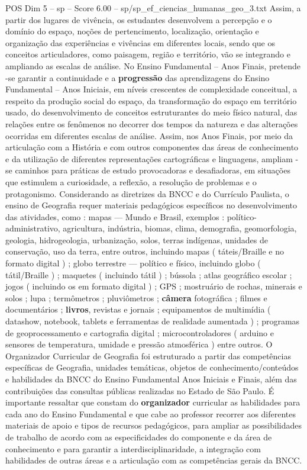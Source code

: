 \begin{textsample}{POS Dim 5 – sp – Score 6.00 – sp/sp\_ef\_ciencias\_humanas\_geo\_3.txt}
Assim, a partir dos lugares de vivência, os estudantes desenvolvem a percepção e o domínio do espaço, noções de pertencimento, localização, orientação e organização das experiências e vivências em diferentes locais, sendo que os conceitos articuladores, como paisagem, região e território, vão se integrando e ampliando as escalas de análise.
No Ensino Fundamental – Anos Finais, pretende -se garantir a continuidade e a \textbf{progressão} das aprendizagens do Ensino Fundamental – Anos Iniciais, em níveis crescentes de complexidade conceitual, a respeito da produção social do espaço, da transformação do espaço em território usado, do desenvolvimento de conceitos estruturantes do meio físico natural, das relações entre os fenômenos no decorrer dos tempos da natureza e das alterações ocorridas em diferentes escalas de análise.
Assim, nos Anos Finais, por meio da articulação com a História e com outros componentes das áreas de conhecimento e da utilização de diferentes representações cartográficas e linguagens, ampliam -se caminhos para práticas de estudo provocadoras e desafiadoras, em situações que estimulem a curiosidade, a reflexão, a resolução de problemas e o protagonismo.
Considerando as diretrizes da BNCC e do Currículo Paulista, o ensino de Geografia requer materiais pedagógicos específicos no desenvolvimento das atividades, como : mapas — Mundo e Brasil, exemplos : político-administrativo, agricultura, indústria, biomas, clima, demografia, geomorfologia, geologia, hidrogeologia, urbanização, solos, terras indígenas, unidades de conservação, uso da terra, entre outros, incluindo mapas ( táteis/Braille e no formato digital ) ; globo terrestre — político e físico, incluindo globo ( tátil/Braille ) ; maquetes ( incluindo tátil ) ; bússola ; atlas geográfico escolar ; jogos ( incluindo os em formato digital ) ; GPS ; mostruário de rochas, minerais e solos ; lupa ; termômetros ; pluviômetros ; \textbf{câmera} fotográfica ; filmes e documentários ; \textbf{livros}, revistas e jornais ; equipamentos de multimídia ( datashow, notebook, tablets e ferramentas de realidade aumentada ) ; programas de geoprocessamento e cartografia digital ; microcontroladores ( arduino e sensores de temperatura, umidade e pressão atmosférica ) entre outros.
O Organizador Curricular de Geografia foi estruturado a partir das competências específicas de Geografia, unidades temáticas, objetos de conhecimento/conteúdos e habilidades da BNCC do Ensino Fundamental Anos Iniciais e Finais, além das contribuições das consultas públicas realizadas no Estado de São Paulo.
É importante ressaltar que constam do \textbf{organizador} curricular as habilidades para cada ano do Ensino Fundamental e que cabe ao professor recorrer aos diferentes materiais de apoio e tipos de recursos pedagógicos, para ampliar as possibilidades de trabalho de acordo com as especificidades do componente e da área de conhecimento e para garantir a interdisciplinaridade, a integração com habilidades de outras áreas e a articulação com as competências gerais da BNCC.

\end{textsample}
